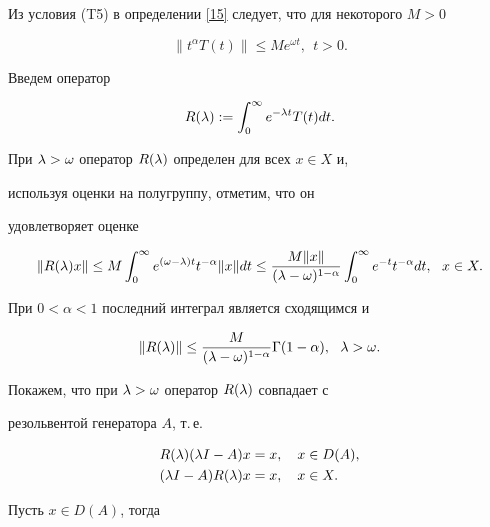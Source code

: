 \begin{pf}


Из условия (T5) в определении \ref{15} следует, что для некоторого $M>0$


$$




\|t^{\alpha}T(t)\|\leq Me^{\omega t},\ \ t>0. 




$$


Введем оператор


\begin{equation}\label{2}


R(\l):=\int^{\infty}_{0}e^{-\l t}T(t)dt.


\end{equation}


При $\lambda>\omega$ оператор $R(\lambda)$ определен для всех $x\in X$ и,


используя оценки на полугруппу, отметим, что он 


удовлетворяет оценке


$$


\|R(\l)x\|\leq M\int^{\infty}_{0}e^{(\omega-\l)t}t^{-\alpha}\|x\|dt


\leq \frac{M\|x\|}{(\l-\omega)^{1-\alpha}}


\int^{\infty}_{0}e^{-t}t^{-\alpha}dt,\ \ x\in X.


$$


При $0<\alpha <1$ последний интеграл является сходящимся и


$$


\|R(\l)\|\leq \frac{M}{(\l-\omega)^{1-\alpha}}\Gamma(1-\alpha),\ \ \l>\omega.


$$


Покажем, что при $\lambda>\omega$ оператор  $R(\lambda)$ совпадает с 


резольвентой генератора $A$, т.\,е.


\begin{align*}


R(\l)(\l I-A)x&=x, \quad x\in D(A), \\


(\l I-A)R(\l)x&=x, \quad x\in X.


\end{align*}


Пусть $x\in D(A)$, тогда


\begin{multline*}



\end{multline*}
\end{pf}
